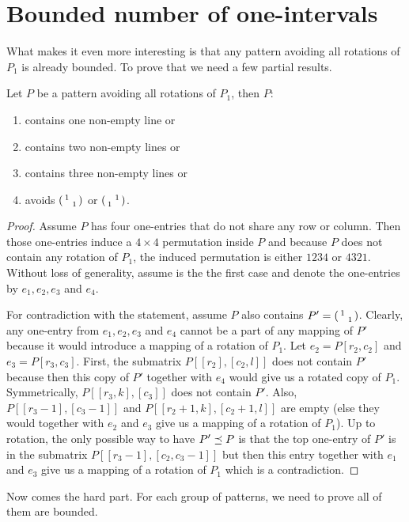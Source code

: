 \section{Bounded number of one-intervals}
What makes it even more interesting is that any pattern avoiding all rotations of $P_1$ is already bounded. To prove that we need a few partial results.
\begin{thm}
Let $P$ be a pattern avoiding all rotations of $P_1$, then $P$:
\begin{enumerate}
	\item contains one non-empty line or
	\item contains two non-empty lines or
	\item contains three non-empty lines or
	\item avoids $\left(\begin{smallmatrix}1& \\ &1\end{smallmatrix}\right)$ or $\left(\begin{smallmatrix} &1\\1& \end{smallmatrix}\right)$.
\end{enumerate}
\end{thm}
\begin{proof}
Assume $P$ has four one-entries that do not share any row or column. Then those one-entries induce a $4\times4$ permutation inside $P$ and because $P$ does not contain any rotation of $P_1$, the induced permutation is either $1234$ or $4321$. Without loss of generality, assume is the the first case and denote the one-entries by $e_1,e_2,e_3$ and $e_4$.

For contradiction with the statement, assume $P$ also contains $P'=\left(\begin{smallmatrix}1& \\ &1\end{smallmatrix}\right)$. Clearly, any one-entry from $e_1,e_2,e_3$ and $e_4$ cannot be a part of any mapping of $P'$ because it would introduce a mapping of a rotation of $P_1$. Let $e_2=P[r_2,c_2]$ and $e_3=P[r_3,c_3]$. First, the submatrix $P[[r_2],[c_2,l]]$ does not contain $P'$ because then this copy of $P'$ together with $e_4$ would give us a rotated copy of $P_1$. Symmetrically, $P[[r_3,k],[c_3]]$ does not contain $P'$. Also, $P[[r_3-1],[c_3-1]]$ and $P[[r_2+1,k],[c_2+1,l]]$ are empty (else they would together with $e_2$ and $e_3$ give us a mapping of a rotation of $P_1$). Up to rotation, the only possible way to have $P'\preceq P$ is that the top one-entry of $P'$ is in the submatrix $P[[r_3-1],[c_2,c_3-1]]$ but then this entry together with $e_1$ and $e_3$ give us a mapping of a rotation of $P_1$ which is a contradiction.
\end{proof}

Now comes the hard part. For each group of patterns, we need to prove all of them are bounded.

